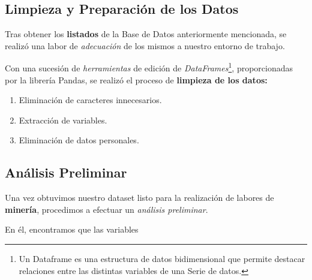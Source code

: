  \subsection{Limpieza y Preparación de los Datos}

 Tras obtener los \textbf{listados} de la Base de Datos anteriormente mencionada, se realizó una labor de \textit{adecuación} de los mismos a nuestro entorno de trabajo.

 Con una sucesión de \textit{herramientas} de edición de \textit{DataFrames}\footnote{Un Dataframe es una estructura de datos bidimensional que permite destacar relaciones entre las distintas variables de una Serie de datos. }, proporcionadas por la librería Pandas\cite{McKinney2010DataPython}, se realizó el proceso de \textbf{limpieza de los datos: }
 \begin{enumerate}
     \item Eliminación de caracteres innecesarios.
     \item Extracción de variables.
     \item Eliminación de datos personales.
 \end{enumerate}



\subsection{Análisis Preliminar}

 Una vez obtuvimos nuestro dataset listo para la realización de labores de \textbf{minería}, procedimos a efectuar un \textit{análisis preliminar}.

 En él, encontramos que las variables 

 